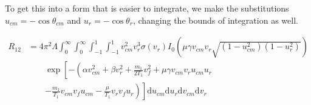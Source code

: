 \documentclass[11pt]{article}
\begin{document}
To get this into a form that is easier to integrate, we make the substitutions $u_{cm} = -\cos \theta_{cm}$ and $u_r = -\cos \theta_r$, changing the bounds of integration as well.

\begin{align*}
	R_{12} &= 4 \pi^2 \Lambda \int_{0}^{\infty} \int_{0}^{\infty} \int_{-1}^{1} \int_{-1}^{1} v_{cm}^2 v_r^3 \sigma(v_r) I_0(\mu \gamma v_{cm} v_r \sqrt{(1 - u_{cm}^2) (1 - u_r^2)}) \\
	& \qquad \exp \left[ -\left( \alpha v_{cm}^2 + \beta  v_r^2 + \frac{m_1}{2 T_1} v_f^2 + \mu \gamma v_{cm} v_r u_{cm} u_r \right. \right. \\
	& \qquad \left. \left. - \frac{m_1}{T_1} v_{cm} v_f u_{cm} - \frac{\mu}{T_1} v_r v_f u_r \right) \right] \mathrm{d} u_{cm} \mathrm{d} u_r \mathrm{d} v_{cm} \mathrm{d} v_r
\end{align*}
\end{document}
